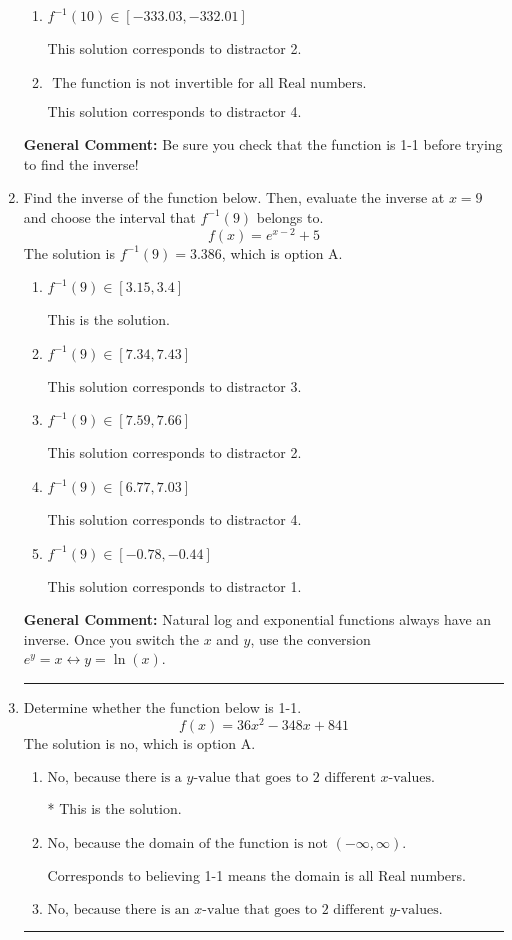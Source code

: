 \documentclass{extbook}[14pt]
\newcommand{\litem}[1]{\item #1

\rule{\textwidth}{0.4pt}}
\begin{document}
\begin{enumerate}
{\begin{enumerate}[label=\Alph*.]
 Distractor 1: This corresponds to 
\item \( f^{-1}(10) \in [-333.03, -332.01] \)

 This solution corresponds to distractor 2.
\item \( \text{ The function is not invertible for all Real numbers. } \)

 This solution corresponds to distractor 4.
\end{enumerate}

\textbf{General Comment:} Be sure you check that the function is 1-1 before trying to find the inverse!
}
\litem{
Find the inverse of the function below. Then, evaluate the inverse at $x = 9$ and choose the interval that $f^{-1}(9)$ belongs to.
\[ f(x) = e^{x-2}+5 \]The solution is \( f^{-1}(9) = 3.386 \), which is option A.\begin{enumerate}[label=\Alph*.]
\item \( f^{-1}(9) \in [3.15, 3.4] \)

 This is the solution.
\item \( f^{-1}(9) \in [7.34, 7.43] \)

 This solution corresponds to distractor 3.
\item \( f^{-1}(9) \in [7.59, 7.66] \)

 This solution corresponds to distractor 2.
\item \( f^{-1}(9) \in [6.77, 7.03] \)

 This solution corresponds to distractor 4.
\item \( f^{-1}(9) \in [-0.78, -0.44] \)

 This solution corresponds to distractor 1.
\end{enumerate}

\textbf{General Comment:} Natural log and exponential functions always have an inverse. Once you switch the $x$ and $y$, use the conversion $ e^y = x \leftrightarrow y=\ln(x)$.
}
\litem{
Determine whether the function below is 1-1.
\[ f(x) = 36 x^2 - 348 x + 841 \]The solution is \( \text{no} \), which is option A.\begin{enumerate}[label=\Alph*.]
\item \( \text{No, because there is a $y$-value that goes to 2 different $x$-values.} \)

* This is the solution.
\item \( \text{No, because the domain of the function is not $(-\infty, \infty)$.} \)

Corresponds to believing 1-1 means the domain is all Real numbers.
\item \( \text{No, because there is an $x$-value that goes to 2 different $y$-values.} \)


\end{enumerate}}
\end{enumerate}
\end{document}
